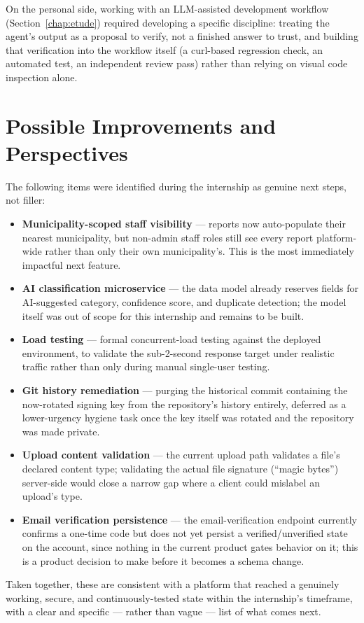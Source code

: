 On the personal side, working with an LLM-assisted development workflow (Section~\ref{chap:etude}) required developing a specific discipline: treating the agent's output as a proposal to verify, not a finished answer to trust, and building that verification into the workflow itself (a curl-based regression check, an automated test, an independent review pass) rather than relying on visual code inspection alone.

\section{Possible Improvements and Perspectives}

The following items were identified during the internship as genuine next steps, not filler:

\begin{itemize}[leftmargin=*]
  \item \textbf{Municipality-scoped staff visibility} --- reports now auto-populate their nearest municipality, but non-admin staff roles still see every report platform-wide rather than only their own municipality's. This is the most immediately impactful next feature.
  \item \textbf{AI classification microservice} --- the data model already reserves fields for AI-suggested category, confidence score, and duplicate detection; the model itself was out of scope for this internship and remains to be built.
  \item \textbf{Load testing} --- formal concurrent-load testing against the deployed environment, to validate the sub-2-second response target under realistic traffic rather than only during manual single-user testing.
  \item \textbf{Git history remediation} --- purging the historical commit containing the now-rotated signing key from the repository's history entirely, deferred as a lower-urgency hygiene task once the key itself was rotated and the repository was made private.
  \item \textbf{Upload content validation} --- the current upload path validates a file's declared content type; validating the actual file signature (``magic bytes'') server-side would close a narrow gap where a client could mislabel an upload's type.
  \item \textbf{Email verification persistence} --- the email-verification endpoint currently confirms a one-time code but does not yet persist a verified/unverified state on the account, since nothing in the current product gates behavior on it; this is a product decision to make before it becomes a schema change.
\end{itemize}

Taken together, these are consistent with a platform that reached a genuinely working, secure, and continuously-tested state within the internship's timeframe, with a clear and specific --- rather than vague --- list of what comes next.
